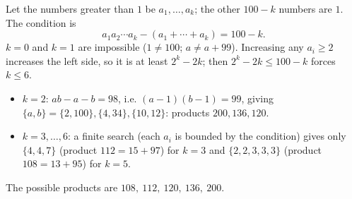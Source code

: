 Let the numbers greater than $1$ be $a_1,\dots,a_k$; the other $100-k$ numbers are $1$. The condition is
\[a_1a_2\cdots a_k-(a_1+\cdots+a_k)=100-k.\]
$k=0$ and $k=1$ are impossible ($1\ne100$; $a\ne a+99$). Increasing any $a_i\ge2$ increases the left side, so it is at least $2^k-2k$; then $2^k-2k\le100-k$ forces $k\le6$.
\begin{itemize}
\item $k=2$: $ab-a-b=98$, i.e. $(a-1)(b-1)=99$, giving $\{a,b\}=\{2,100\},\{4,34\},\{10,12\}$: products $200,136,120$.
\item $k=3,\dots,6$: a finite search (each $a_i$ is bounded by the condition) gives only $\{4,4,7\}$ (product $112=15+97$) for $k=3$ and $\{2,2,3,3,3\}$ (product $108=13+95$) for $k=5$.
\end{itemize}
The possible products are $\boxed{108,\ 112,\ 120,\ 136,\ 200}$.
